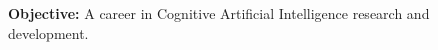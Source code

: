 \documentclass[11pt]{article}
\title{}
\author{\textbf{Matthew Thomas Pisano}\\212 DeWitt Mills Road, Hurley, New York\\
    \href{mailto:matthewpisano14@gmail.com}{matthewpisano14@gmail.com}\\(845)-706-0677}
\date{}
\begin{document}
    \pagestyle{plain} 
    \maketitle
    \vspace{-0.4in}
    \hspace*{-0.3in}
    \textbf{Objective:} A career in Cognitive Artificial Intelligence research and development.

    
\end{document}

